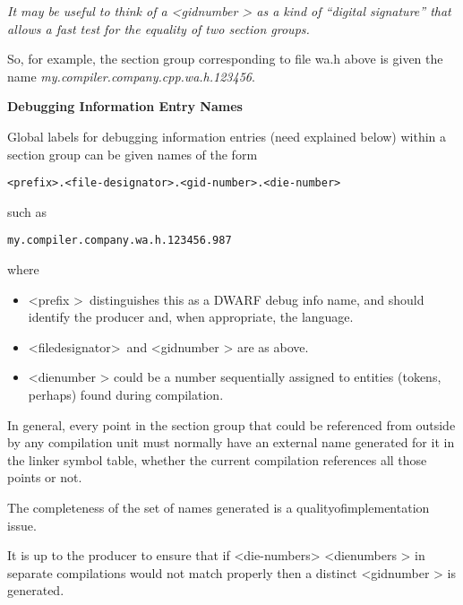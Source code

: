 \textit{It may be useful to think of a 
\textless gid\dash number \textgreater
as a kind
of ``digital signature'' that allows a fast test for the
equality of two section groups.}

So, for example, the section group corresponding to file wa.h
above is given the name \textit{my.compiler.company.cpp.wa.h.123456}.



\textbf{Debugging Information Entry Names}

Global labels for 
debugging information entries (need explained
below) within a section group can be given names of the form

\begin{alltt}
    <prefix>.<file-designator>.<gid-number>.<die-number>
\end{alltt}

such as

\begin{alltt}
    my.compiler.company.wa.h.123456.987
\end{alltt}

where
\begin{itemize}
\item \textless prefix \textgreater\  
distinguishes this as a DWARF debug info name, and should identify the producer
and, when appropriate, the language.
\item \textless file\dash designator\textgreater\  
and 
\textless gid\dash number \textgreater
are as above.

\item  \textless die\dash number \textgreater
could be a number sequentially assigned 
to entities (tokens, perhaps) found
during compilation.

\end{itemize}

In general, every point in the section group 
 that
could be referenced from outside by any compilation unit must
normally have an external name generated for it in the linker
symbol table, whether the current compilation references all
those points or not.

The completeness of the set of names generated is a
quality\dash of\dash implementation issue.

It is up to the producer to ensure that if 
<die-numbers>
\textless die\dash numbers \textgreater
in separate compilations would not match properly then a
distinct 
\textless gid\dash number \textgreater
is generated.

